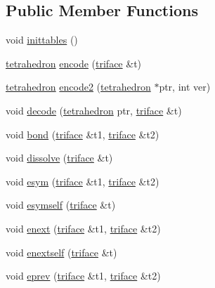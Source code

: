 \subsection*{Public Member Functions}
\begin{DoxyCompactItemize}
\item 
void \hyperlink{classtetgenmesh_af1a7205fe0e5e6256f301e6c47b752b6}{inittables} ()
\item 
\hyperlink{classtetgenmesh_a6a12b1c0d1834ca941d16c62e949e5e3}{tetrahedron} \hyperlink{classtetgenmesh_a7c32f356cc7f0e57f442f9dac4fccb8a}{encode} (\hyperlink{classtetgenmesh_1_1triface}{triface} \&t)
\item 
\hyperlink{classtetgenmesh_a6a12b1c0d1834ca941d16c62e949e5e3}{tetrahedron} \hyperlink{classtetgenmesh_a2bc1e8e424ea557d033135dafcf165bb}{encode2} (\hyperlink{classtetgenmesh_a6a12b1c0d1834ca941d16c62e949e5e3}{tetrahedron} $\ast$ptr, int ver)
\item 
void \hyperlink{classtetgenmesh_a809cfdec35ae9a52670e045823a302c0}{decode} (\hyperlink{classtetgenmesh_a6a12b1c0d1834ca941d16c62e949e5e3}{tetrahedron} ptr, \hyperlink{classtetgenmesh_1_1triface}{triface} \&t)
\item 
void \hyperlink{classtetgenmesh_ad7b47aeb5b8d5ab677d86fcafa619a35}{bond} (\hyperlink{classtetgenmesh_1_1triface}{triface} \&t1, \hyperlink{classtetgenmesh_1_1triface}{triface} \&t2)
\item 
void \hyperlink{classtetgenmesh_ac0e0919c3b91b0e55dadbdaae2554074}{dissolve} (\hyperlink{classtetgenmesh_1_1triface}{triface} \&t)
\item 
void \hyperlink{classtetgenmesh_a523cfafc3be8e0ead97a13707b33e4b3}{esym} (\hyperlink{classtetgenmesh_1_1triface}{triface} \&t1, \hyperlink{classtetgenmesh_1_1triface}{triface} \&t2)
\item 
void \hyperlink{classtetgenmesh_a9c4f9877ba70f7c0f399b7fcdd8fdddf}{esymself} (\hyperlink{classtetgenmesh_1_1triface}{triface} \&t)
\item 
void \hyperlink{classtetgenmesh_acf741079840d587ec0d71354cea6e6cf}{enext} (\hyperlink{classtetgenmesh_1_1triface}{triface} \&t1, \hyperlink{classtetgenmesh_1_1triface}{triface} \&t2)
\item 
void \hyperlink{classtetgenmesh_a1c65efaf2a8a72d023327c2592d89188}{enextself} (\hyperlink{classtetgenmesh_1_1triface}{triface} \&t)
\item 
void \hyperlink{classtetgenmesh_a5f04514ee657caf3131156a233e713c8}{eprev} (\hyperlink{classtetgenmesh_1_1triface}{triface} \&t1, \hyperlink{classtetgenmesh_1_1triface}{triface} \&t2)

\end{DoxyCompactItemize}
